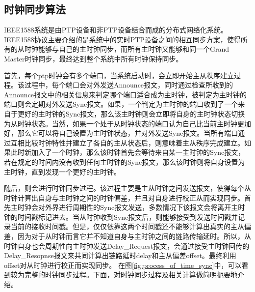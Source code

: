 
\subsection{时钟同步算法}
IEEE1588系统是由PTP设备和非PTP设备结合而成的分布式网络化系统。IEEE1588协议主要介绍的是系统中的实时PTP设备之间的相互同步方案，使得所有的从时钟能够与自己的主时钟同步，而所有主时钟又能够和同一个Grand Master时钟同步，最终达到整个系统中所有时钟保持同步。

首先，每个ptp时钟会有多个端口，当系统启动时，会立即开始主从秩序建立过程。该过程中，每个端口会对外发送Announce报文，同时通过检查所收到的Announce报文中的相关信息来判定哪个端口适合成为主时钟，被判定为主时钟的端口则会定期对外发送Sync报文。如果，一个判定为主时钟的端口收到了一个来自于更好的主时钟的Sync报文，那么该主时钟则会立即将自身的主时钟状态切换为从时钟状态。当然，如果一个处于从时钟状态的端口认为自己比当前主时钟更加好，那么它可以将自己设置为主时钟状态，并对外发送Sync报文。当所有端口通过互相比较时钟特性并建立了各自的主从状态后，则意味着主从秩序完成建立。如果此时新加入了一个时钟，那么该时钟首先会等待来自某一主时钟的Sync报文，若在规定的时间内没有收到任何主时钟的Sync报文，那么该时钟则将自身设置为主时钟，直到发现一个更好的主时钟。

随后，则会进行时钟同步过程。该过程主要是主从时钟之间发送报文，使得每个从时钟计算出自身与主时钟之间的时钟偏差，并且对自身进行校正从而实现同步。首先主时钟会对外界进行周期性的Sync报文发送，多数情况下该报文会将离开主时钟的时间戳标记进去。当从时钟收到Sync报文后，则能够接受到发送时间戳并记录当前的接收时间戳。但是，仅仅依靠这两个时间戳还不能够计算出真实的主从偏差，因为对于从时钟而言它并不知道自身与主时钟之间的链路传输延时。所以，从时钟自身也会周期性向主时钟发送Delay\_Request报文，会通过接受主时钟回传的Delay\_Resopnse报文来共同计算出链路延时delay和主从偏差offset。最终利用offset对从时钟进行校正而实现同步。
\label{sec:1588_theory_sync}
在图\ref{fig:process_of_time_sync}中，可以看到较为完整的时钟同步过程。下面，对时钟同步过程及相关计算做简明扼要地介绍。

